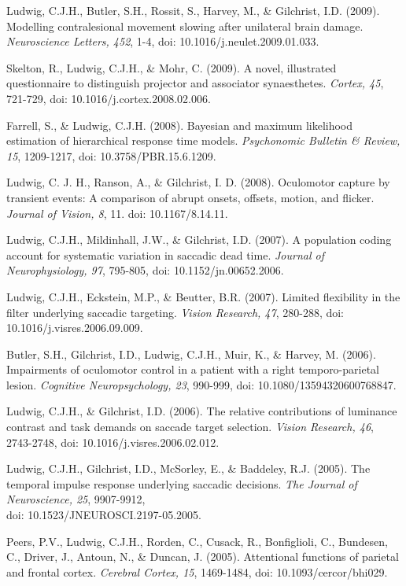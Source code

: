 \documentclass[a4paper, 10pt]{article}
\renewenvironment{itemize}{
  \begin{list}{}{
    \setlength{\leftmargin}{1.5em}
  }
}{
  \end{list}
}
\begin{document}
\begin{itemize}
\item Ludwig, C.J.H., Butler, S.H., Rossit, S., Harvey, M., \& Gilchrist, I.D. (2009). Modelling contralesional movement slowing after unilateral brain damage. {\it Neuroscience Letters, 452}, 1-4, doi: 10.1016/j.neulet.2009.01.033.
\item Skelton, R., Ludwig, C.J.H., \& Mohr, C. (2009). A novel, illustrated questionnaire to distinguish projector and associator synaesthetes. {\it Cortex, 45}, 721-729, doi: 10.1016/j.cortex.2008.02.006.
\item Farrell, S., \& Ludwig, C.J.H. (2008). Bayesian and maximum likelihood estimation of hierarchical response time models. {\it Psychonomic Bulletin \& Review, 15}, 1209-1217, doi: 10.3758/PBR.15.6.1209.
\item Ludwig, C. J. H., Ranson, A., \& Gilchrist, I. D. (2008). Oculomotor capture by transient events: A comparison of abrupt onsets, offsets, motion, and flicker. {\it Journal of Vision, 8}, 11. doi: 10.1167/8.14.11.
\item  Ludwig, C.J.H., Mildinhall, J.W., \& Gilchrist, I.D. (2007). A population coding account for systematic variation in saccadic dead time. {\it Journal of Neurophysiology, 97}, 795-805, doi: 10.1152/jn.00652.2006.
\item Ludwig, C.J.H., Eckstein, M.P., \& Beutter, B.R. (2007). Limited flexibility in the filter underlying saccadic targeting. {\it Vision Research, 47}, 280-288, doi: 10.1016/j.visres.2006.09.009.
\item Butler, S.H., Gilchrist, I.D., Ludwig, C.J.H., Muir, K., \& Harvey, M. (2006). Impairments of oculomotor control in a patient with a right temporo-parietal lesion. {\it Cognitive Neuropsychology, 23}, 990-999, doi: 10.1080/13594320600768847.
\item Ludwig, C.J.H., \& Gilchrist, I.D. (2006). The relative contributions of luminance contrast and task demands on saccade target selection. {\it Vision Research, 46}, 2743-2748, doi: 10.1016/j.visres.2006.02.012.
\item Ludwig, C.J.H., Gilchrist, I.D., McSorley, E., \& Baddeley, R.J. (2005). The temporal impulse response underlying saccadic decisions. {\it The Journal of Neuroscience, 25}, 9907-9912, \\doi: 10.1523/JNEUROSCI.2197-05.2005.
\item Peers, P.V., Ludwig, C.J.H., Rorden, C., Cusack, R., Bonfiglioli, C., Bundesen, C., Driver, J., Antoun, N., \& Duncan, J. (2005). Attentional functions of parietal and frontal cortex. {\it Cerebral Cortex, 15}, 1469-1484, doi: 10.1093/cercor/bhi029.

\end{itemize}
\end{document}
